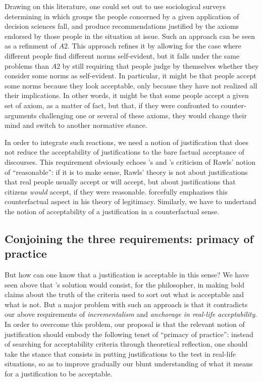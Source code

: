 \documentclass[preprint, french, english, 11pt, authoryear]{elsarticle}%
\begin{document}
Drawing on this literature, one could set out to use sociological surveys determining in which groups the people concerned by a given application of decision sciences fall, and produce recommendations justified by the axioms endorsed by those people in the situation at issue. Such an approach can be seen as a refinment of $A2$. This approach refines it by allowing for the case where different people find different norms self-evident, but it falls under the same problems than $A2$ by still requiring that people judge by themselves whether they consider some norms as self-evident. In particular, it might be that people accept some norms because they look acceptable, only because they have not realized all their implications.  In other words, it might be that some people accept a given set of axiom, as a matter of fact, but that, if they were confronted to counter-arguments challenging one or several of these axioms, they would change their mind and switch to another normative stance.

In order to integrate such reactions, we need a notion of justification that does not reduce the acceptability of justifications to the bare factual acceptance of discourses. This requirement obviously echoes \cite{habermas_reconciliation_1995}'s and \cite{estlund_democratic_2009}'s criticism of Rawls' notion of “reasonable”: if it is to make sense, Rawls' theory is not about justifications that real people usually accept or will accept, but about justifications that citizens \emph{would} accept, if they were reasonable. \citet{habermas_faktizitat_1992} forcefully emphazises this counterfactual aspect in his theory of legitimacy. Similarly, we have to undertand the notion of acceptability of a justification in a counterfactual sense. 

\subsection{Conjoining the three requirements: primacy of practice}
But how can one know that a justification is acceptable in this sense? We have seen above that \cite{estlund_democratic_2009}'s solution would consist, for the philosopher, in making bold claims about the truth of the criteria used to sort out what is acceptable and what is not. But a major problem with such an approach is that it contradicts our above requirements of \emph{incrementalism} and \emph{anchorage in real-life acceptability}. In order to overcome this problem, our proposal is that the relevant notion of justification should embody the following tenet of “primacy of practice”: instead of searching for acceptability criteria through theoretical reflection, one should take the stance that consists in putting justifications to the test in real-life situations, so as to improve gradually our blunt understanding of what it means for a justification to be acceptable.
\end{document}

